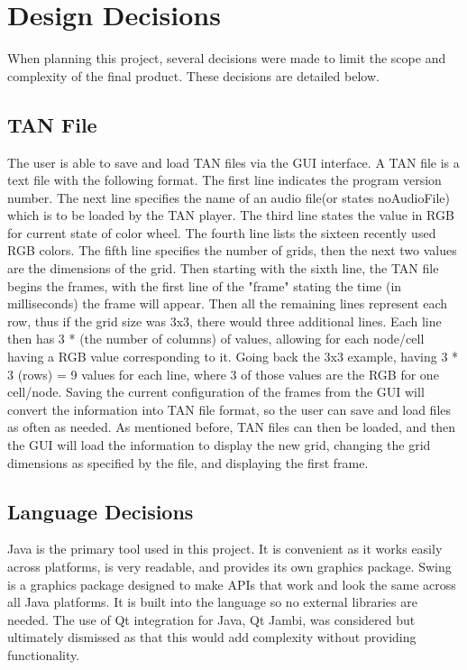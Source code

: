 \documentclass[12pt]{article}
\begin{document}
	\section{Design Decisions}
    When planning this project, several decisions were made to limit the scope and complexity of the final product. These decisions are detailed below. 
    
  	\subsection{TAN File}
	  	The user is able to save and load TAN files via the GUI interface. A TAN file is a text file with the following format.
      The first line indicates the program version number. The next line specifies the name of an audio file(or states noAudioFile) which is to be loaded by the TAN player. The third line states the value in RGB for current state of color wheel. The fourth line lists the sixteen recently used RGB colors. The fifth line specifies the number of grids, then the next two values are the dimensions of the grid. Then starting with the sixth line, the TAN file begins the frames, with the first line of the "frame" stating the time (in milliseconds) the frame will appear. Then all the remaining lines represent each row, thus if the grid size was 3x3, there would three additional lines. Each line then has 3 * (the number of columns) of values, allowing for each node/cell having a RGB value corresponding to it. Going back the 3x3 example, having 3 * 3 (rows) = 9 values for each line, where 3 of those values are the RGB for one cell/node. Saving the current configuration of the frames from the GUI will convert the information into TAN file format, so the user can save and load files as often as needed. As mentioned before, TAN files can then be loaded, and then the GUI will load the information to display the new grid, changing the grid dimensions as specified by the file, and displaying the first frame.
  	
  	\subsection{Language Decisions}
    	Java is the primary tool used in this project. It is convenient as it works easily across platforms, is very readable, and provides its own graphics package. Swing is a graphics package designed to make APIs that work and look the same across all Java platforms. It is built into the language so no external libraries are needed. The use of Qt integration for Java, Qt Jambi, was considered but ultimately dismissed as that this would add complexity without providing functionality. 
      
\end{document}
